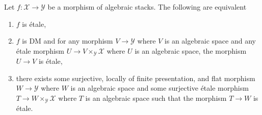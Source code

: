 \begin{lemma}
\label{lemma-etale}
Let $f : \mathcal{X} \to \mathcal{Y}$ be a morphism of algebraic stacks.
The following are equivalent
\begin{enumerate}
\item $f$ is \'etale,
\item $f$ is DM and for any morphism $V \to \mathcal{Y}$
where $V$ is an algebraic space and any \'etale morphism
$U \to V \times_\mathcal{Y} \mathcal{X}$ where $U$ is an algebraic space,
the morphism $U \to V$ is \'etale,
\item there exists some surjective, locally of finite presentation, and flat
morphism $W \to \mathcal{Y}$ where $W$ is an algebraic space and some
surjective \'etale morphism $T \to W \times_\mathcal{Y} \mathcal{X}$
where $T$ is an algebraic space such that the morphism $T \to W$ is \'etale.
\end{enumerate}
\end{lemma}

